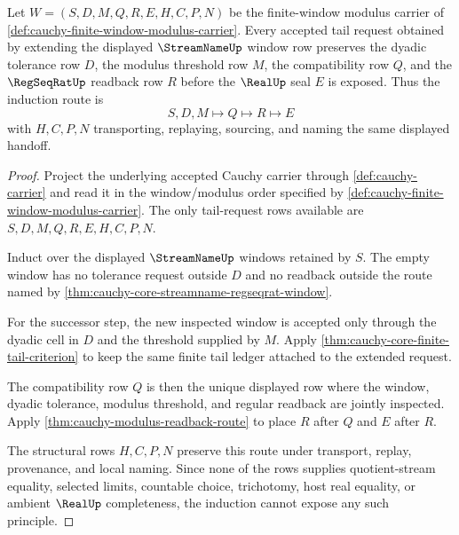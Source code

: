 \begin{theorem}
\label{thm:cauchy-finite-window-tail-induction}
Let $W=(S,D,M,Q,R,E,H,C,P,N)$ be the finite-window modulus carrier of \autoref{def:cauchy-finite-window-modulus-carrier}. Every accepted tail request obtained by extending the displayed $\StreamNameUp$ window row preserves the dyadic tolerance row $D$, the modulus threshold row $M$, the compatibility row $Q$, and the $\RegSeqRatUp$ readback row $R$ before the $\RealUp$ seal $E$ is exposed. Thus the induction route is
$$
S,D,M \longmapsto Q \longmapsto R \longmapsto E
$$
with $H,C,P,N$ transporting, replaying, sourcing, and naming the same displayed handoff.
\end{theorem}
\begin{proof}
Project the underlying accepted Cauchy carrier through \autoref{def:cauchy-carrier} and read it in the window/modulus order specified by \autoref{def:cauchy-finite-window-modulus-carrier}. The only tail-request rows available are $S,D,M,Q,R,E,H,C,P,N$.

Induct over the displayed $\StreamNameUp$ windows retained by $S$. The empty window has no tolerance request outside $D$ and no readback outside the route named by \autoref{thm:cauchy-core-streamname-regseqrat-window}.

For the successor step, the new inspected window is accepted only through the dyadic cell in $D$ and the threshold supplied by $M$. Apply \autoref{thm:cauchy-core-finite-tail-criterion} to keep the same finite tail ledger attached to the extended request.

The compatibility row $Q$ is then the unique displayed row where the window, dyadic tolerance, modulus threshold, and regular readback are jointly inspected. Apply \autoref{thm:cauchy-modulus-readback-route} to place $R$ after $Q$ and $E$ after $R$.

The structural rows $H,C,P,N$ preserve this route under transport, replay, provenance, and local naming. Since none of the rows supplies quotient-stream equality, selected limits, countable choice, trichotomy, host real equality, or ambient $\RealUp$ completeness, the induction cannot expose any such principle.
\end{proof}

